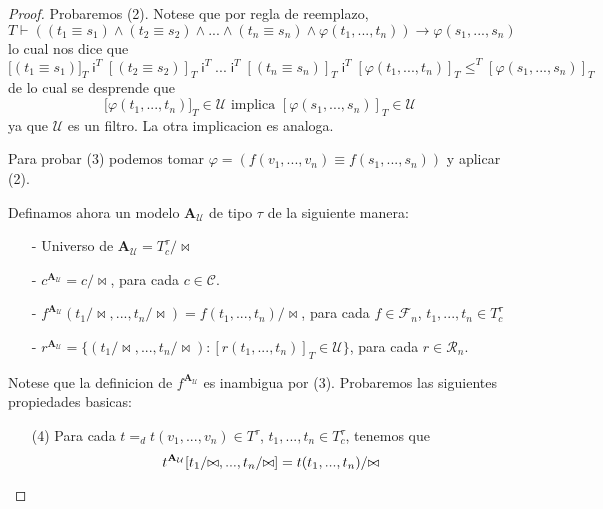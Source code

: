 \begin{proof}
Probaremos (2). Notese que por regla de reemplazo,
\begin{equation*}
T\vdash \left( (t_{1}\equiv s_{1})\wedge (t_{2}\equiv s_{2})\wedge ...\wedge
(t_{n}\equiv s_{n})\wedge \varphi (t_{1},...,t_{n})\right) \rightarrow
\varphi (s_{1},...,s_{n})
\end{equation*}%
lo cual nos dice que%
\begin{equation*}
\lbrack (t_{1}\equiv s_{1})]_{T}\;\mathsf{i}^{T}\mathsf{\;}[(t_{2}\equiv
s_{2})]_{T}\;\mathsf{i}^{T}\mathsf{\;}...\;\mathsf{i}^{T}\mathsf{\;}%
[(t_{n}\equiv s_{n})]_{T}\;\mathsf{i}^{T}\mathsf{\;}[\varphi
(t_{1},...,t_{n})]_{T}\leq ^{T}[\varphi (s_{1},...,s_{n})]_{T}
\end{equation*}%
de lo cual se desprende que%
\begin{equation*}
\lbrack \varphi (t_{1},...,t_{n})]_{T}\in \mathcal{U}\text{ implica }%
[\varphi (s_{1},...,s_{n})]_{T}\in \mathcal{U}
\end{equation*}%
ya que $\mathcal{U}$ es un filtro. La otra implicacion es analoga.

Para probar (3) podemos tomar $\varphi =\left( f(v_{1},...,v_{n})\equiv
f(s_{1},...,s_{n})\right) $ y aplicar (2).

Definamos ahora un modelo $\mathbf{A}_{\mathcal{U}}$ de tipo $\tau $ de la
siguiente manera:

\begin{enumerate}
\item[-] Universo de $\mathbf{A}_{\mathcal{U}}=T_{c}^{\tau }/\mathrm{\bowtie 
}$

\item[-] $c^{\mathbf{A}_{\mathcal{U}}}=c/\mathrm{\bowtie }$, para cada $c\in 
\mathcal{C}$.

\item[-] $f^{\mathbf{A}_{\mathcal{U}}}(t_{1}/\mathrm{\bowtie },...,t_{n}/%
\mathrm{\bowtie })=f(t_{1},...,t_{n})/\mathrm{\bowtie }$, para cada $f\in 
\mathcal{F}_{n}$, $t_{1},...,t_{n}\in T_{c}^{\tau }\;$

\item[-] $r^{\mathbf{A}_{\mathcal{U}}}=\{(t_{1}/\mathrm{\bowtie },...,t_{n}/%
\mathrm{\bowtie }):[r(t_{1},...,t_{n})]_{T}\in \mathcal{U}\}$, para cada $%
r\in \mathcal{R}_{n}$.
\end{enumerate}

Notese que la definicion de $f^{\mathbf{A}_{\mathcal{U}}}$ es inambigua por
(3). Probaremos las siguientes propiedades basicas:

\begin{enumerate}
\item[(4)] Para cada $t=_{d}t(v_{1},...,v_{n})\in T^{\tau }$, $%
t_{1},...,t_{n}\in T_{c}^{\tau }$, tenemos que%
\begin{equation*}
t^{\mathbf{A}_{\mathcal{U}}}[t_{1}/\mathrm{\bowtie },...,t_{n}/\mathrm{%
\bowtie }]=t(t_{1},...,t_{n})/\mathrm{\bowtie }
\end{equation*}


\end{enumerate}
\end{proof}
